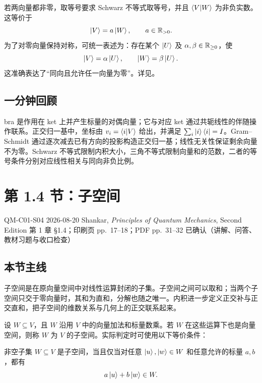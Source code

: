 若两向量都非零，取等号要求 Schwarz 不等式取等号，并且 $\left\langle V \middle| W \right\rangle$ 为非负实数。这等价于
\[
  \left|V\right\rangle=a\left|W\right\rangle,\qquad a\in\mathbb{R}_{>0}.
\]
为了对零向量保持对称，可统一表述为：存在某个 $\left|U\right\rangle$ 及 $\alpha,\beta\in\mathbb{R}_{\geq0}$，使
\[
  \left|V\right\rangle=\alpha\left|U\right\rangle,
  \qquad
  \left|W\right\rangle=\beta\left|U\right\rangle.
\]
这准确表达了“同向且允许任一向量为零”。详见。

\subsection{一分钟回顾}

bra 是作用在 ket 上并产生标量的对偶向量；它与对应 ket 通过共轭线性的伴随操作联系。正交归一基中，坐标由 $v_i=\left\langle i \middle| V \right\rangle$ 给出，并满足 $\sum_i\left|i\right\rangle\left\langle i\right|=I$。Gram--Schmidt 通过逐次减去已有方向的投影构造正交归一基；线性无关性保证剩余向量不为零。Schwarz 不等式限制内积大小，三角不等式限制向量和的范数，二者的等号条件分别对应线性相关与同向非负比例。

\section{第 1.4 节：子空间}
\label{section:QM-C01-S04}

\studymeta
  {QM-C01-S04}
  {2026-08-20}
  {Shankar, \textit{Principles of Quantum Mechanics}, Second Edition}
  {第 1 章 \S 1.4；印刷页 pp.~17--18；PDF pp.~31--32}
  {已确认（讲解、问答、教材习题与收口检查）}

\subsection{本节主线}

子空间是在原向量空间中对线性运算封闭的子集。子空间之间可以取和；当两个子空间只交于零向量时，其和为直和，分解也随之唯一。内积进一步定义正交补与正交直和，把子空间的维数关系与几何上的正交联系起来。


设 $W\subseteq V$，且 $W$ 沿用 $V$ 中的向量加法和标量数乘。若 $W$ 在这些运算下也是向量空间，则称 $W$ 为 $V$ 的子空间。实际判定时可使用以下等价条件：

\begin{theorem}[子空间判据]
非空子集 $W\subseteq V$ 是子空间，当且仅当对任意 $\left|u\right\rangle,\left|w\right\rangle\in W$ 和任意允许的标量 $a,b$，都有
\begin{equation}
  a\left|u\right\rangle+b\left|w\right\rangle\in W.
  \label{eq:QM-C01-S04-subspace-test}
\end{equation}
\end{theorem}


